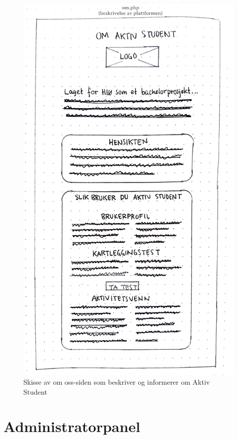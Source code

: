 \begin{figure}[H]
\centering
\includegraphics[width=.7\textwidth]{Illustrasjoner/Skisser/1.0/1-21-om-aktiv-student.jpg}
\caption{Skisse av om oss-siden som beskriver og informerer om Aktiv Student}
\label{vedlegg:1-21-om}
\end{figure}

\section{Administratorpanel}

